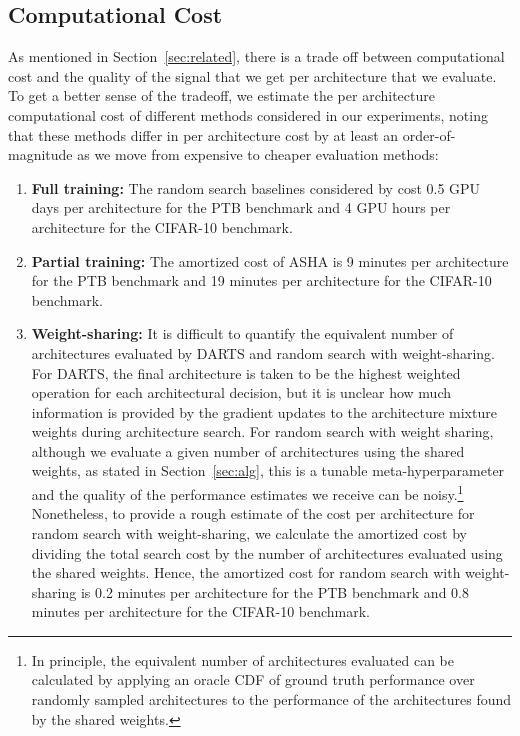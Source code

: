 \documentclass[acmlarge, nonacm]{acmart}
\begin{document}
\subsection{Computational Cost}  
As mentioned in Section~\ref{sec:related}, there is a trade off between computational cost and the quality of the signal that we get per architecture that we evaluate.  
To get a better sense of the tradeoff, we estimate the per architecture computational cost of different methods considered in our experiments, noting that these methods differ in per architecture cost by at least an order-of-magnitude as we move from expensive to cheaper evaluation methods:
\begin{enumerate}
    \item \textbf{Full training:} The random search baselines considered by \citet{liu2018darts} cost 0.5 GPU days per architecture for the PTB benchmark and 4 GPU hours per architecture for the CIFAR-10 benchmark.
    \item \textbf{Partial training:} The amortized cost of ASHA is 9 minutes per architecture for the PTB benchmark and 19 minutes per architecture for the CIFAR-10 benchmark.
    \item \textbf{Weight-sharing:}  It is difficult to quantify the equivalent number of architectures evaluated by DARTS and random search with weight-sharing. For DARTS, the final architecture is taken to be the highest weighted operation for each architectural decision, but it is unclear how much information is provided by the gradient updates to the architecture mixture weights during architecture search.  For random search with weight sharing, although we evaluate a given number of architectures using the shared weights, as stated in Section~\ref{sec:alg}, this is a tunable meta-hyperparameter and the quality of the performance estimates we receive can be noisy.\footnote{In principle, the equivalent number of architectures evaluated can be calculated by applying an oracle CDF of ground truth performance over randomly sampled architectures to the performance of the architectures found by the shared weights.}  Nonetheless, to provide a rough estimate of the cost per architecture for random search with weight-sharing, we calculate the amortized cost by dividing the total search cost by the number of architectures evaluated using the shared weights.  Hence, the amortized cost for random search with weight-sharing is 0.2 minutes per architecture for the PTB benchmark and 0.8 minutes per architecture for the CIFAR-10 benchmark. 
\end{enumerate}
\end{document}
